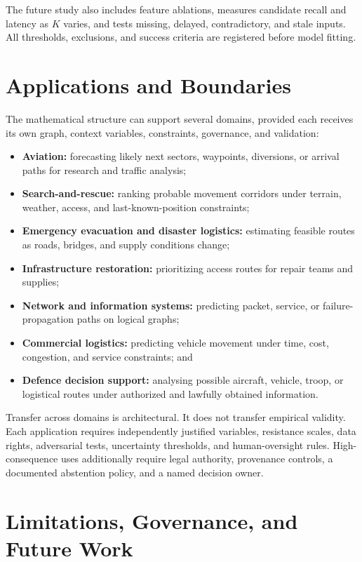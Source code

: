 \documentclass[11pt,letterpaper]{article}
\begin{document}
The future study also includes feature ablations, measures candidate recall and latency as $K$ varies, and tests missing, delayed, contradictory, and stale inputs. All thresholds, exclusions, and success criteria are registered before model fitting.

\section{Applications and Boundaries}

The mathematical structure can support several domains, provided each receives its own graph, context variables, constraints, governance, and validation:

\begin{itemize}
  \item \textbf{Aviation:} forecasting likely next sectors, waypoints, diversions, or arrival paths for research and traffic analysis;
  \item \textbf{Search-and-rescue:} ranking probable movement corridors under terrain, weather, access, and last-known-position constraints;
  \item \textbf{Emergency evacuation and disaster logistics:} estimating feasible routes as roads, bridges, and supply conditions change;
  \item \textbf{Infrastructure restoration:} prioritizing access routes for repair teams and supplies;
  \item \textbf{Network and information systems:} predicting packet, service, or failure-propagation paths on logical graphs;
  \item \textbf{Commercial logistics:} predicting vehicle movement under time, cost, congestion, and service constraints; and
  \item \textbf{Defence decision support:} analysing possible aircraft, vehicle, troop, or logistical routes under authorized and lawfully obtained information.
\end{itemize}

Transfer across domains is architectural. It does not transfer empirical validity. Each application requires independently justified variables, resistance scales, data rights, adversarial tests, uncertainty thresholds, and human-oversight rules. High-consequence uses additionally require legal authority, provenance controls, a documented abstention policy, and a named decision owner.

\section{Limitations, Governance, and Future Work}
\end{document}
